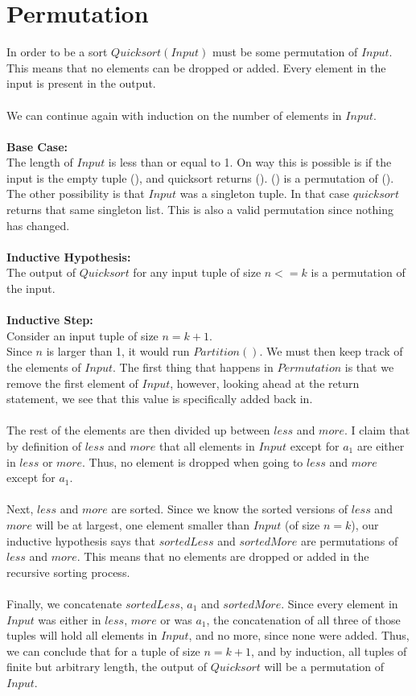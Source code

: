 \documentclass{article}
\begin{document}
\section{Permutation}
In order to be a sort $Quicksort(Input)$ must be some permutation of $Input$. This means that no elements can be dropped or added. Every element in the input is present in the output.
\\\\
We can continue again with induction on the number of elements in $Input$.\\\\
\textbf{Base Case:} \\
The length of $Input$ is less than or equal to 1. On way this is possible is if the input is the empty tuple (), and quicksort returns (). () is a permutation of (). The other possibility is that $Input$ was a singleton tuple. In that case $quicksort$ returns that same singleton list. This is also a valid permutation since nothing has changed.
\\\\
\textbf{Inductive Hypothesis:}\\
The output of $Quicksort$ for any input tuple of size $n<=k$ is a permutation of the input.
\\\\
\textbf{Inductive Step:}\\
Consider an input tuple of size $n=k+1$.\\
Since $n$ is larger than 1, it would run $Partition()$.
We must then keep track of the elements of $Input$. The first thing that happens in $Permutation$ is that we remove the first element of $Input$, however, looking ahead at the return statement, we see that this value is specifically added back in.
\\\\
The rest of the elements are then divided up between $less$ and $more$. I claim that by definition of  $less$ and $more$ that all elements in $Input$ except for $a_{1}$ are either in $less$ or $more$. Thus, no element is dropped when going to $less$ and $more$ except for $a_{1}$. 
\\\\
Next, $less$ and $more$ are sorted. Since we know the sorted versions of $less$ and $more$ will be at largest, one element smaller than $Input$ (of size $n=k$), our inductive hypothesis says that $sortedLess$ and $sortedMore$ are permutations of $less$ and $more$. This means that no elements are dropped or added in the recursive sorting process. 
\\\\
Finally, we concatenate $sortedLess$, $a_{1}$ and $sortedMore$. Since every element in $Input$ was either in $less$, $more$ or was $a_{1}$, the concatenation of all three of those tuples will hold all elements in $Input$, and no more, since none were added. Thus, we can conclude that for a tuple of size $n=k+1$, and by induction, all tuples of finite but arbitrary length, the output of $Quicksort$ will be a permutation of $Input$.
\end{document}
